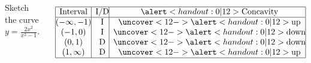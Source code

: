 \begin{frame}[t]
\begin{example}[Example 1, p. 245]
\begin{columns}[t]
Sketch the curve $y = \frac{2x^2}{x^2-1}$.
\ %
%

\abovedisplayskip=0pt
\belowdisplayskip=0pt
\[
\begin{array}{|@{}c@{}|c@{}|c@{}|}
\hline
\textrm{Interval}&\textrm{I/D}&\alert<handout:0| 12>{\textrm{Concavity}}\\
\hline
(-\infty , -1)&%
\textrm{I}&\uncover<12->{\alert<handout:0| 12>{\textrm{up}}}\\%
(-1 , 0)&%
\textrm{I}&\uncover<12->{\alert<handout:0| 12>{\textrm{down}}}\\%
(0 , 1)&%
\textrm{D}&\uncover<12->{\alert<handout:0| 12>{\textrm{down}}}\\%
(1 , \infty)&%
\textrm{D}&\uncover<12->{\alert<handout:0| 12>{\textrm{up}}}\\%
\hline
\end{array}
\]


\end{columns}
\end{example}
\end{frame}
